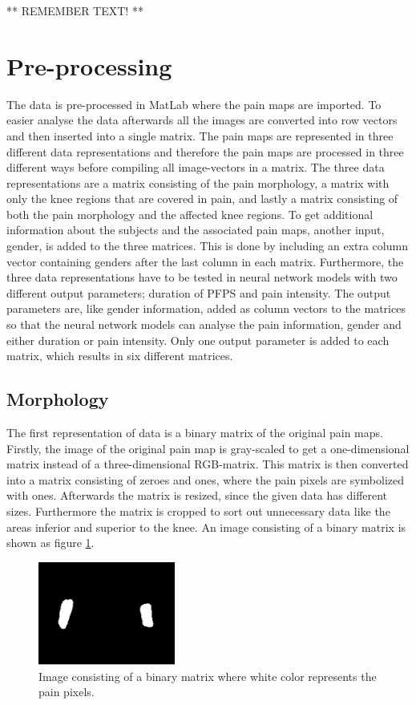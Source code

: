 ** REMEMBER TEXT! **

\section{Pre-processing}
The data is pre-processed in MatLab where the pain maps are imported. To easier analyse the data afterwards all the images are converted into row vectors and then inserted into a single matrix. The pain maps are represented in three different data representations and therefore the pain maps are processed in three different ways before compiling all image-vectors in a matrix. 
The three data representations are a matrix consisting of the pain morphology, a matrix with only the knee regions that are covered in pain, and lastly a matrix consisting of both the pain morphology and the affected knee regions. 
To get additional information about the subjects and the associated pain maps, another input, gender, is added to the three matrices. This is done by including an extra column vector containing genders after the last column in each matrix. 
Furthermore, the three data representations have to be tested in neural network models with two different output parameters; duration of PFPS and pain intensity. The output parameters are, like gender information, added as column vectors to the matrices so that the neural network models can analyse the pain information, gender and either duration or pain intensity. Only one output parameter is added to each matrix, which results in six different matrices.

\subsection{Morphology} \label{sec:Morph}
The first representation of data is a binary matrix of the original pain maps. 
Firstly, the image of the original pain map is gray-scaled to get a one-dimensional matrix instead of a three-dimensional RGB-matrix. This matrix is then converted into a matrix consisting of zeroes and ones, where the pain pixels are symbolized with ones. Afterwards the matrix is resized, since the given data has different sizes. Furthermore the matrix is cropped to sort out unnecessary data like the areas inferior and superior to the knee. An image consisting of a binary matrix is shown as figure \ref{fig:cropbin7}.

\begin{figure} [H]
\centering
\includegraphics[width=0.4\textwidth]{figures/cropbin7}
\caption{Image consisting of a binary matrix where white color represents the pain pixels.}
\label{fig:cropbin7}
\end{figure}

